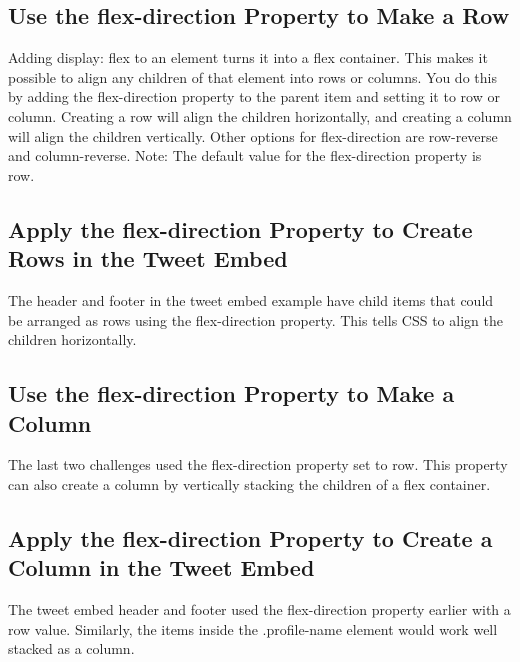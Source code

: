\documentclass{article}%
\begin{document}
%
\subsection{Use the flex{-}direction Property to Make a Row}%
\label{subsec:Usetheflex{-}directionPropertytoMakeaRow}%
Adding display: flex to an element turns it into a flex container. This makes it possible to align any children of that element into rows or columns. You do this by adding the flex{-}direction property to the parent item and setting it to row or column. Creating a row will align the children horizontally, and creating a column will align the children vertically.\newline%
Other options for flex{-}direction are row{-}reverse and column{-}reverse.\newline%
Note: The default value for the flex{-}direction property is row.\newline%

%
\subsection{Apply the flex{-}direction Property to Create Rows in the Tweet Embed}%
\label{subsec:Applytheflex{-}directionPropertytoCreateRowsintheTweetEmbed}%
The header and footer in the tweet embed example have child items that could be arranged as rows using the flex{-}direction property. This tells CSS to align the children horizontally.\newline%

%
\subsection{Use the flex{-}direction Property to Make a Column}%
\label{subsec:Usetheflex{-}directionPropertytoMakeaColumn}%
The last two challenges used the flex{-}direction property set to row. This property can also create a column by vertically stacking the children of a flex container.\newline%

%
\subsection{Apply the flex{-}direction Property to Create a Column in the Tweet Embed}%
\label{subsec:Applytheflex{-}directionPropertytoCreateaColumnintheTweetEmbed}%
The tweet embed header and footer used the flex{-}direction property earlier with a row value. Similarly, the items inside the .profile{-}name element would work well stacked as a column.\newline%
\end{document}

